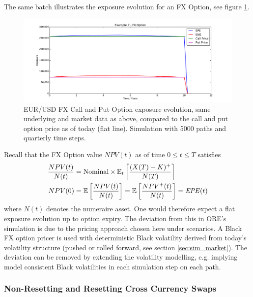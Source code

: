 The same batch illustrates the exposure evolution for an FX Option, see figure \ref{fig_7}.
\begin{figure}[h!]
\begin{center}
\includegraphics[scale=0.45]{examples/mpl_fxoption.pdf}
\end{center}
\caption{EUR/USD FX Call and Put Option exposure evolution, same underlying and market data as above,
  compared to the call and put option price as of today (flat line). Simulation with 5000 paths and
  quarterly time steps.}
\label{fig_7}
\end{figure}
Recall that the FX Option value $NPV(t)$ as of time $0 \leq t \leq T$ satisfies
\begin{align*}
\frac{NPV(t)}{N(t)} &= \mbox{Nominal}\times\operatorname{\mathbb{E}}_t\left[\frac{(X(T) - K)^+}{N(T)}\right]\\
NPV(0) &= \operatorname{\mathbb{E}}\left[\frac{NPV(t)}{N(t)}\right] = \operatorname{\mathbb{E}}\left[\frac{NPV^+(t)}{N(t)} \right]= \mathit{EPE}(t) 
\end{align*}
where $N(t)$ denotes the numeraire asset.
One would therefore expect a flat exposure evolution up to option expiry. The deviation from this in ORE's simulation is
due to the pricing approach chosen here under scenarios. A Black FX option pricer is used with deterministic Black
volatility derived from today's volatility structure (pushed or rolled forward, see section \ref{sec:sim_market}). The
deviation can be removed by extending the volatility modelling, e.g. implying model consistent Black volatilities in
each simulation step on each path.  

\subsubsection{Non-Resetting and Resetting Cross Currency Swaps}\label{example:exposure_ccs}

